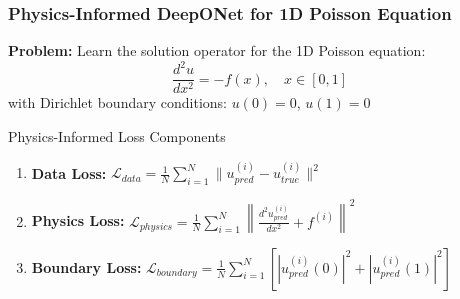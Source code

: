 \documentclass[notes]{beamer}
\begin{document}
\begin{frame}
\frametitle{Physics-Informed DeepONet for 1D Poisson Equation}

\textbf{Problem:} Learn the solution operator for the 1D Poisson equation:
\begin{equation*}
\frac{d^2u}{dx^2} = -f(x), \quad x \in [0,1]
\end{equation*}
with Dirichlet boundary conditions: $u(0) = 0$, $u(1) = 0$

\vspace{1cm}

\begin{block}{Physics-Informed Loss Components}
\begin{enumerate}
    \item \textbf{Data Loss:} $\mathcal{L}_{data} = \frac{1}{N} \sum_{i=1}^N \|u_{pred}^{(i)} - u_{true}^{(i)}\|^2$
    \item \textbf{Physics Loss:} $\mathcal{L}_{physics} = \frac{1}{N} \sum_{i=1}^N \left\|\frac{d^2u_{pred}^{(i)}}{dx^2} + f^{(i)}\right\|^2$
    \item \textbf{Boundary Loss:} $\mathcal{L}_{boundary} = \frac{1}{N} \sum_{i=1}^N \left[|u_{pred}^{(i)}(0)|^2 + |u_{pred}^{(i)}(1)|^2\right]$
\end{enumerate}
\end{block}

\vspace{0.5cm}

\centering
\href{https://colab.research.google.com/github/kks32-courses/ut-portugal-sciml/blob/main/docs/02-deeponet/pideeponet.ipynb}{}

\end{frame}
\end{document}
